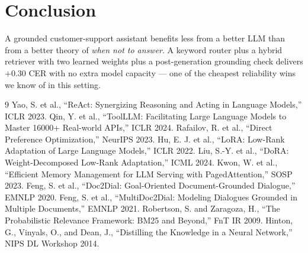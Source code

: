 \documentclass[11pt,a4paper]{article}
\begin{document}
\section{Conclusion}
A grounded customer-support assistant benefits less from a better LLM than from a better theory of \emph{when not to answer}. A keyword router plus a hybrid retriever with two learned weights plus a post-generation grounding check delivers $+0.30$ CER with no extra model capacity --- one of the cheapest reliability wins we know of in this setting.

\begin{thebibliography}{9}
\small
{} Yao, S. et al., ``ReAct: Synergizing Reasoning and Acting in Language Models,'' ICLR 2023.
 Qin, Y. et al., ``ToolLLM: Facilitating Large Language Models to Master 16000+ Real-world APIs,'' ICLR 2024.
 Rafailov, R. et al., ``Direct Preference Optimization,'' NeurIPS 2023.
 Hu, E. J. et al., ``LoRA: Low-Rank Adaptation of Large Language Models,'' ICLR 2022.
 Liu, S.-Y. et al., ``DoRA: Weight-Decomposed Low-Rank Adaptation,'' ICML 2024.
 Kwon, W. et al., ``Efficient Memory Management for LLM Serving with PagedAttention,'' SOSP 2023.
 Feng, S. et al., ``Doc2Dial: Goal-Oriented Document-Grounded Dialogue,'' EMNLP 2020.
 Feng, S. et al., ``MultiDoc2Dial: Modeling Dialogues Grounded in Multiple Documents,'' EMNLP 2021.
 Robertson, S. and Zaragoza, H., ``The Probabilistic Relevance Framework: BM25 and Beyond,'' FnT IR 2009.
 Hinton, G., Vinyals, O., and Dean, J., ``Distilling the Knowledge in a Neural Network,'' NIPS DL Workshop 2014.
\end{thebibliography}
\end{document}
